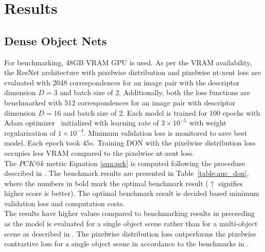 \chapter{Results}

\section{Dense Object Nets}

For benchmarking, 48GB VRAM GPU is used. As per the VRAM availability, the \ac{ResNet} architecture with pixelwise distribution and pixelwise nt-xent loss are evaluated
with 2048 correspondences for an image pair with the descriptor dimension $D=3$ and batch size of 2. Additionally, both the loss functions are benchmarked with 512 correspondences
for an image pair with descriptor dimension $D=16$ and batch size of 2. Each model is trained for 100 epochs with Adam optimizer~\cite{kingma2014adam} initialized
with learning rate of $3 \times 10^{-5}$ with weight regularization of $1 \times 10^{-4}$. Minimum validation loss is monitored to save best model.
Each epoch took $45s$. Training \ac{DON} with the pixelwise distribution loss occupies less VRAM compared to the pixelwise nt-xent loss.\\

The $PCK@k$ metric Equation \ref{eqn:pck} is computed following the procedure described in \cite{adrian2022efficient}.
The benchmark results are presented in Table~\ref{table:auc_don}, where the numbers in bold
mark the optimal benchmark result ($\uparrow$ signifies higher score is better). The optimal benchmark result is decided based minimum validation loss and computation costs.\\

The results have higher values compared to benchmarking results in preceeding \cite{adrian2022efficient} as the model is evaluated for a single object scene
rather than for a multi-object scene as described in \cite{adrian2022efficient}. The pixelwise distribution loss outperforms the pixelwise contrastive loss for a single object scene in accordance to the
benchmarks in \cite{adrian2022efficient}.

